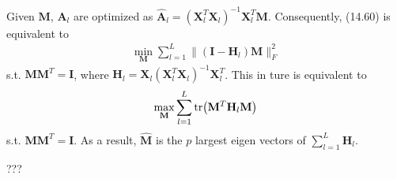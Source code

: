\begin{exercise}
  Given $\mathbf{M}$, $\mathbf{A}_l$ are optimized as $\hat{\mathbf{A}}_l =
  (\mathbf{X}_l^T\mathbf{X}_l)^{-1}\mathbf{X}_l^T\mathbf{M}$. Consequently,
  (14.60) is equivalent to
  \begin{align}
    \min_{\mathbf{M}} \sum_{l=1}^L \|(\mathbf{I} - \mathbf{H}_l)\mathbf{M}\|_F^2
  \end{align}
  s.t. $\mathbf{M}\mathbf{M}^T = \mathbf{I}$, where $\mathbf{H}_l =
  \mathbf{X}_l(\mathbf{X}_l^T\mathbf{X}_l)^{-1}\mathbf{X}_l^T$. This in ture is
  equivalent to
  \begin{align}
    \max_{\mathbf{M}} \sum_{l=1}^L \tr(\mathbf{M}^T\mathbf{H}_l\mathbf{M})
  \end{align}
  s.t. $\mathbf{M}\mathbf{M}^T = \mathbf{I}$. As a result, $\hat{\mathbf{M}}$ is
  the $p$ largest eigen vectors of $ \sum_{l=1}^L\mathbf{H}_l$.
\end{exercise}

\begin{exercise}
  ???
\end{exercise}

